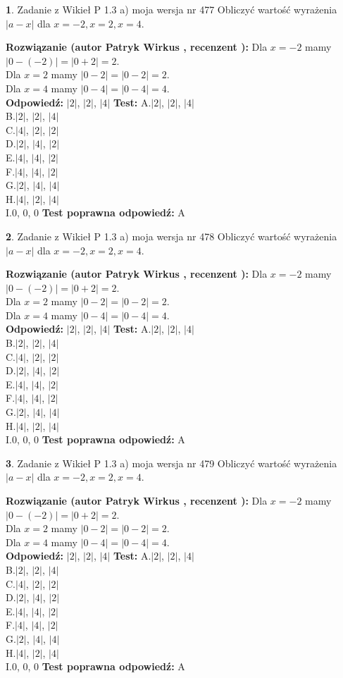 \documentclass[12pt, a4paper]{article}
\theoremstyle{definition} %
\newtheorem{zad}{}
\newcommand{\zadStart}[1]{\begin{zad}#1\newline}
\newcommand{\zadStop}{\end{zad}}
\newcommand{\rozwStart}[2]{\noindent \textbf{Rozwiązanie (autor #1 , recenzent #2): }\newline}
\newcommand{\rozwStop}{\newline}
\newcommand{\odpStart}{\noindent \textbf{Odpowiedź:}\newline}
\newcommand{\odpStop}{\newline}
\newcommand{\testStart}{\noindent \textbf{Test:}\newline}
\newcommand{\testStop}{\newline}
\newcommand{\kluczStart}{\noindent \textbf{Test poprawna odpowiedź:}\newline}
\newcommand{\kluczStop}{\newline}
\begin{document}
\zadStart{Zadanie z Wikieł P 1.3 a) moja wersja nr 477}
Obliczyć wartość wyrażenia $|a - x|$ dla $x=-2,x=2,x=4$.
\zadStop
\rozwStart{Patryk Wirkus}{}
Dla $x = -2$ mamy $|0 - (-2)| = |0 + 2| = 2$.\\
Dla $x = 2$ mamy $|0 - 2| = |0 - 2| = 2$.\\
Dla $x = 4$ mamy $|0 - 4| = |0 - 4| = 4$.\\
\rozwStop
\odpStart
$|2|$, $|2|$, $|4|$
\odpStop
\testStart
A.$|2|$, $|2|$, $|4|$\\
B.$|2|$, $|2|$, $|4|$\\
C.$|4|$, $|2|$, $|2|$\\
D.$|2|$, $|4|$, $|2|$\\
E.$|4|$, $|4|$, $|2|$\\
F.$|4|$, $|4|$, $|2|$\\
G.$|2|$, $|4|$, $|4|$\\
H.$|4|$, $|2|$, $|4|$\\
I.$0$, $0$, $0$
\testStop
\kluczStart
A
\kluczStop



\zadStart{Zadanie z Wikieł P 1.3 a) moja wersja nr 478}
Obliczyć wartość wyrażenia $|a - x|$ dla $x=-2,x=2,x=4$.
\zadStop
\rozwStart{Patryk Wirkus}{}
Dla $x = -2$ mamy $|0 - (-2)| = |0 + 2| = 2$.\\
Dla $x = 2$ mamy $|0 - 2| = |0 - 2| = 2$.\\
Dla $x = 4$ mamy $|0 - 4| = |0 - 4| = 4$.\\
\rozwStop
\odpStart
$|2|$, $|2|$, $|4|$
\odpStop
\testStart
A.$|2|$, $|2|$, $|4|$\\
B.$|2|$, $|2|$, $|4|$\\
C.$|4|$, $|2|$, $|2|$\\
D.$|2|$, $|4|$, $|2|$\\
E.$|4|$, $|4|$, $|2|$\\
F.$|4|$, $|4|$, $|2|$\\
G.$|2|$, $|4|$, $|4|$\\
H.$|4|$, $|2|$, $|4|$\\
I.$0$, $0$, $0$
\testStop
\kluczStart
A
\kluczStop



\zadStart{Zadanie z Wikieł P 1.3 a) moja wersja nr 479}
Obliczyć wartość wyrażenia $|a - x|$ dla $x=-2,x=2,x=4$.
\zadStop
\rozwStart{Patryk Wirkus}{}
Dla $x = -2$ mamy $|0 - (-2)| = |0 + 2| = 2$.\\
Dla $x = 2$ mamy $|0 - 2| = |0 - 2| = 2$.\\
Dla $x = 4$ mamy $|0 - 4| = |0 - 4| = 4$.\\
\rozwStop
\odpStart
$|2|$, $|2|$, $|4|$
\odpStop
\testStart
A.$|2|$, $|2|$, $|4|$\\
B.$|2|$, $|2|$, $|4|$\\
C.$|4|$, $|2|$, $|2|$\\
D.$|2|$, $|4|$, $|2|$\\
E.$|4|$, $|4|$, $|2|$\\
F.$|4|$, $|4|$, $|2|$\\
G.$|2|$, $|4|$, $|4|$\\
H.$|4|$, $|2|$, $|4|$\\
I.$0$, $0$, $0$
\testStop
\kluczStart
A
\kluczStop
\end{document}
